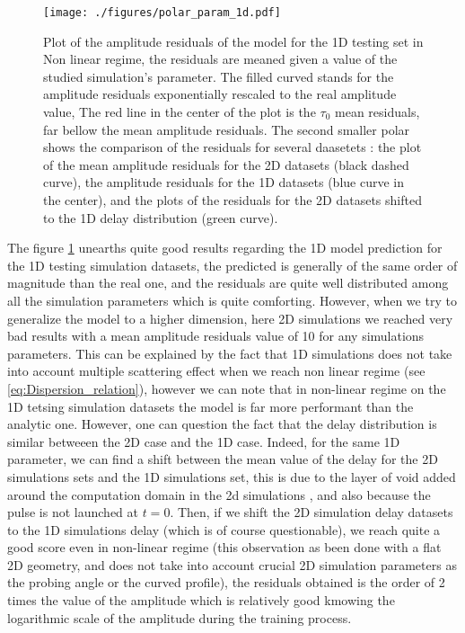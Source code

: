 \documentclass[11pt,a4paper,openany]{report}
\begin{document}
\begin{multicols}{2}
    \begin{figure}[H]
        \texttt{[image: ./figures/polar\_param\_1d.pdf]}
        \caption{Plot of the amplitude residuals of the model for the 1D testing set in Non linear regime, the residuals are meaned given a value of the studied simulation's parameter. The filled curved stands for the amplitude residuals exponentially rescaled to the real amplitude value, The red line in the center of the plot is the $\tau_0$ mean residuals, far bellow the mean amplitude residuals. The second smaller polar shows the comparison of the residuals for several daasetets : the plot of the mean amplitude residuals for the 2D datasets (black dashed curve), the amplitude residuals for the 1D datasets (blue curve in the center), and the plots of the residuals for the 2D datasets shifted to the 1D delay distribution (green curve).}
        \label{fig:polar_1d}
    \end{figure}

    The figure \ref{fig:polar_1d} unearths quite good results regarding the 1D model prediction for the 1D testing simulation datasets, the predicted is generally of the same order of magnitude than the real one, and the residuals are quite well distributed among all the simulation parameters which is quite comforting. However, when we try to generalize the model to a higher dimension, here 2D simulations we reached very bad results with a mean amplitude residuals value of 10 for any simulations parameters. This can be explained by the fact that 1D simulations does not take into account multiple scattering effect when we reach non linear regime (see \ref{eq:Dispersion_relation}), however we can note that in non-linear regime on the 1D tetsing simulation datasets the model is far more performant than the analytic one. However, one can question the fact that the delay distribution is similar betweeen the 2D case and the 1D case. Indeed, for the same 1D parameter, we can find a shift between the mean value of the delay for the 2D simulations sets and the 1D simulations set, this is due to the layer of void added around the computation domain in the 2d simulations \cite{SPR_Krutkin}, and also because the pulse is not launched at $t=0$. Then, if we shift the 2D simulation delay datasets to the 1D simulations delay (which is of course questionable), we reach quite a good score even in non-linear regime (this observation as been done with a flat 2D geometry, and does not take into account crucial 2D simulation parameters as the probing angle or the curved profile), the residuals obtained is the order of 2 times the value of the amplitude which is relatively good kmowing the logarithmic scale of the amplitude during the training process.


\end{multicols}
\end{document}
